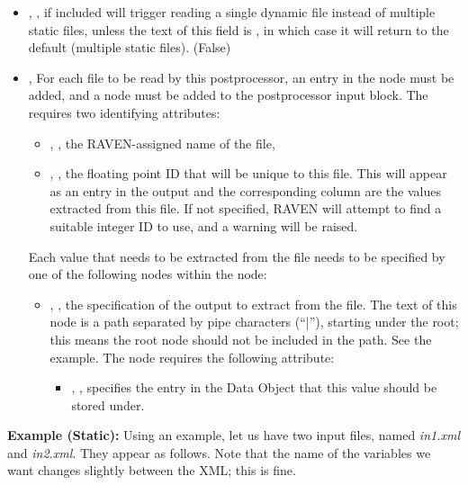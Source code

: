 \begin{itemize}
  \item {}, , if included will trigger reading a single dynamic
  file instead of multiple static files, unless the text of this field is , in which case it
  will return to the default (multiple static files).  (False)
  \item {}, 
  For each file to be read by this postprocessor, an entry in the  node must be added, and a
   node must be added to the postprocessor input block.  The  requires two
  identifying attributes:
  \begin{itemize}
    \item {}, , the RAVEN-assigned name of the file,
    \item {}, , the floating point ID that will be unique to this
      file.  This will appear as an entry in the output  and the corresponding column are
      the values extracted from this file.  If not specified, RAVEN will attempt to find a suitable integer ID
      to use, and a warning will be raised.
  \end{itemize}
  Each value that needs to be extracted from the file needs to be specified by one of the following
   nodes within the  node:
  \begin{itemize}
    \item {}, ,
           the specification of the output to extract from the file.  The text of this node is a path
           separated by pipe characters (``|''), starting under the root; this means the root node should not
           be included in the path. See the example.
           The  node requires the following attribute:
      \begin{itemize}
        \item {}, , specifies the entry in the Data Object that
          this value should be stored under.
      \end{itemize}

  \end{itemize}
\end{itemize}
\textbf{Example (Static):}
Using an example, let us have two input files, named \emph{in1.xml} and \emph{in2.xml}.  They appear as
follows.  Note that the name of the variables we want changes slightly between the XML; this is fine.

